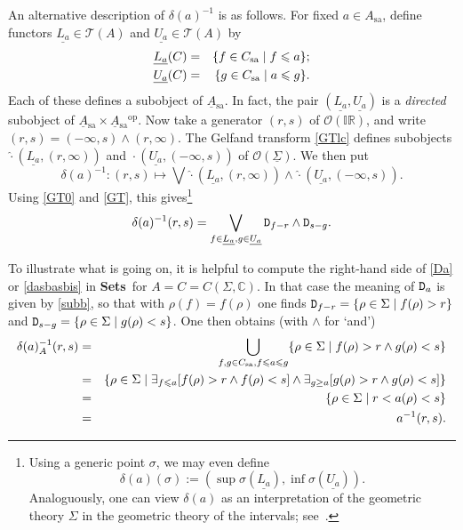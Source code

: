 \documentclass[11pt]{article}
\newcommand{\IR}{\mathbb{IR}}
\newcommand{\beq}{\begin{equation}}
\newcommand{\eeq}{\end{equation}}
\newcommand{\Sets}{\mbox{\textbf{Sets}}}
\newcommand{\inv}{^{-1}}
\newcommand{\er}{\eqref}
\newcommand{\dl}{\delta} \newcommand{\Dl}{\Delta}
\newcommand{\rh}{\rho} \newcommand{\sg}{\sigma}
\newcommand{\Sg}{\Sigma} \newcommand{\ta}{\tau} \newcommand{\ph}{\phi}
\newcommand{\CO}{{\mathcal O}} \newcommand{\CP}{{\mathcal P}}
\newcommand{\C}{{\mathbb C}} \newcommand{\D}{{\mathbb D}}
\newcommand{\alg}[1]{\ensuremath{#1}}
\newcommand{\functor}[1]{\ensuremath{\underline{#1}}}
\newcommand{\op}{\ensuremath{^{\mathrm{op}}}}
\newcommand{\asstopos}{\ensuremath{\mathcal{T}}}
\newcommand{\sa}{\ensuremath{_{\mathrm{sa}}}}
\newcommand{\prop}[1]{\ensuremath{\mbox{\texttt{#1}}}}
\newcommand{\uA}{\underline{A}}
\newcommand{\TA}{\mathcal{T}(A)}
\newcommand{\ulS}{\functor{\Sigma}}
\renewcommand{\TA}{\asstopos(\alg{A})}
\begin{document}
An alternative description of $\dl(a)\inv$ is as follows.
For fixed $a\in A\sa$, define functors $\underline{L_a}\in\TA$ and
$\underline{U_a}\in\TA$ by
 \begin{eqnarray}
\underline{L_a}(C)&=& \{f\in C\sa\mid f\leqslant a\}; \nn\\
\underline{U_a}(C)&=& \{g\in C\sa\mid a\leqslant g\}.
\end{eqnarray}
Each of these defines a subobject of $\uA\sa$. In fact, the pair $(\underline{L_a},
\underline{U_a})$ is a
\emph{directed} subobject of $\uA\sa\times \uA\sa\op$.
Now take a  generator $(r,s)$ of $\CO(\IR)$, and write $(r,s)=(-\infty,s)\wedge (r,\infty)$.
The Gelfand transform \er{GTlc} defines subobjects $\hat{\cdot}(\underline{L_a},
(r,\infty))$
and $\hat{\cdot}(\underline{U_a}, (-\infty,s))$ of $\CO(\ulS)$. We then put
\beq
  \dl(a)\inv: (r,s)\mapsto \bigvee \hat{\cdot}(\underline{L_a}, (r,\infty))
\wedge \hat{\cdot}(\underline{U_a}, (-\infty,s)).
  \eeq
Using \er{GT0} and \er{GT}, this gives\footnote{Using
a generic point $\sigma$, we may even define\[\dl(a)(\sigma):=(\sup
\sigma(\underline{L_a}),\inf \sigma(\underline{U_a})).\] Analoguously, one can view $\dl(a)$ as an interpretation of
the geometric theory $\Sigma$ in the geometric theory of the intervals;
see~\cite{Coquand/Spitters:integrals-valuations}.}
\beq
  \dl(a)^{-1}(r,s)
  = \bigvee_{f \in \underline{L_a}, g \in \underline{U_a}} \prop{D}_{f-r} \wedge \prop{D}_{s-g}.
  \label{dasbasbis}
\eeq

To illustrate what is going on, it is helpful to
 compute the right-hand side of \er{Da} or \er{dasbasbis} in \Sets\ for $A=C=C(\Sigma,\C)$.  In that case the meaning of $\prop{D}_a$ is given by \er{subb}, so that with $\rh(f)=f(\rh)$ one finds
 $\prop{D}_{f-r}=\{\rh\in\Sg\mid f(\rh)>r\}$ and $\prop{D}_{s-g}=\{\rh\in\Sg\mid g(\rh)<s\}$.
One then obtains (with $\wedge$ for `and')
  \begin{eqnarray}
\dl(a)_A^{-1}(r,s)&=& \bigcup_{ f,g\in C\sa, f \leqslant a \leqslant g}\{\rh\in\Sg\mid f(\rh)>r \wedge
g(\rh)<s\} \nn \\ &=&
 \{\rho \in \Sg \mid \exists_{f \leqslant a}[f(\rho)>r \wedge f(\rho)<s]
     \wedge\exists_{g \geq a}[g(\rho)> r \wedge g(\rho)<s]\}\nn \\
  & =& \{\rho \in \Sg \mid r < a(\rho) < s\}\nn \\
  & = &a^{-1}(r,s). \label{ainverse}\end{eqnarray}
\end{document}

